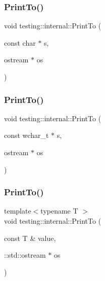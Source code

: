 \mbox{\label{namespacetesting_1_1internal_adc6c98306d40b53fd07be4e295102a0a}} 
\subsubsection{\texorpdfstring{PrintTo()}{PrintTo()}\hspace{0.1cm}{\footnotesize\ttfamily [2/20]}}
{\footnotesize\ttfamily void testing\+::internal\+::\+Print\+To (\begin{DoxyParamCaption}\item[{const char $\ast$}]{s,  }\item[{ostream $\ast$}]{os }\end{DoxyParamCaption})}

\mbox{\label{namespacetesting_1_1internal_afc20fb56b2547a8f91f9ff99650f2024}} 
\subsubsection{\texorpdfstring{PrintTo()}{PrintTo()}\hspace{0.1cm}{\footnotesize\ttfamily [3/20]}}
{\footnotesize\ttfamily void testing\+::internal\+::\+Print\+To (\begin{DoxyParamCaption}\item[{const wchar\+\_\+t $\ast$}]{s,  }\item[{ostream $\ast$}]{os }\end{DoxyParamCaption})}

\mbox{\label{namespacetesting_1_1internal_adb3c27150dbe661db0e0c4be27533460}} 
\subsubsection{\texorpdfstring{PrintTo()}{PrintTo()}\hspace{0.1cm}{\footnotesize\ttfamily [4/20]}}
{\footnotesize\ttfamily template$<$typename T $>$ \\
void testing\+::internal\+::\+Print\+To (\begin{DoxyParamCaption}\item[{const T \&}]{value,  }\item[{\+::std\+::ostream $\ast$}]{os }\end{DoxyParamCaption})}

